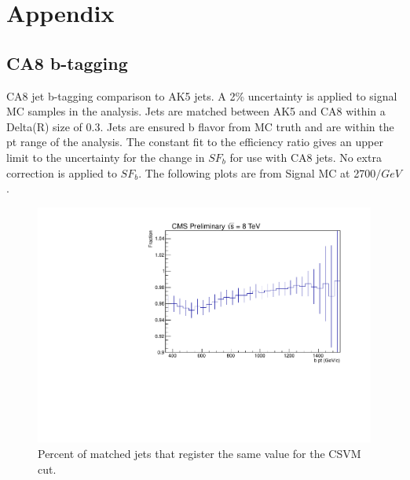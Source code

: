 \chapter{Appendix}
\label{sec:appendix}
\section{CA8 b-tagging}
\label{sec:ca8toak5}


CA8 jet b-tagging comparison to AK5 jets. A 2\% uncertainty is applied to signal MC samples in the analysis.  Jets are matched between AK5 and CA8 
within a Delta(R) size of 0.3.
Jets are ensured b flavor from MC truth and are within the pt range of the analysis.  The constant fit to the efficiency ratio gives an upper limit to the uncertainty 
for the change in $SF_b$ for use with CA8 jets.  No extra correction is applied to $SF_b$.  The following plots are from Signal MC at 2700$/GeV$. 

\begin{figure}[Htcb]
\centering
\includegraphics[width=1.0\textwidth]{figs/bpercentr32700.pdf}
\caption{Percent of matched jets that register the same value for the CSVM cut.}
\label{figs:bpercent}
\end{figure}

